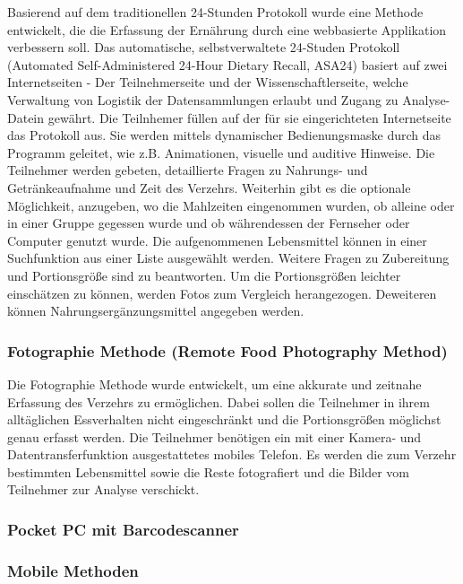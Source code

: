 Basierend auf dem traditionellen 24-Stunden Protokoll wurde eine Methode entwickelt, die die Erfassung der Ernährung durch eine webbasierte Applikation verbessern soll. Das automatische, selbstverwaltete 24-Studen Protokoll (Automated Self-Administered 24-Hour Dietary Recall, ASA24) basiert auf zwei Internetseiten - Der Teilnehmerseite und der Wissenschaftlerseite, welche Verwaltung von Logistik der Datensammlungen erlaubt und  Zugang zu Analyse-Datein gewährt. Die Teilnhemer füllen auf der für sie eingerichteten Internetseite das Protokoll aus. Sie werden mittels dynamischer Bedienungsmaske durch das Programm geleitet, wie z.B. Animationen, visuelle und auditive Hinweise. Die Teilnehmer werden gebeten, detaillierte Fragen zu Nahrungs- und Getränkeaufnahme und Zeit des Verzehrs. Weiterhin gibt es die optionale Möglichkeit, anzugeben, wo die Mahlzeiten eingenommen wurden, ob alleine oder in einer Gruppe gegessen wurde und ob währendessen der Fernseher oder Computer genutzt wurde. 
Die aufgenommenen Lebensmittel können in einer Suchfunktion aus einer Liste ausgewählt werden. Weitere Fragen zu Zubereitung und Portionsgröße sind zu beantworten. Um die Portionsgrößen leichter einschätzen zu können, werden Fotos zum Vergleich herangezogen. Deweiteren können Nahrungsergänzungsmittel angegeben werden.  \cite{asa24} \cite{Subar20121134}





\subsubsection{Fotographie Methode (Remote Food Photography Method)}

Die Fotographie Methode wurde entwickelt, um eine akkurate und zeitnahe Erfassung des Verzehrs zu ermöglichen. Dabei sollen die Teilnehmer in ihrem alltäglichen Essverhalten nicht eingeschränkt und die Portionsgrößen möglichst genau erfasst werden. \cite{5333123}
Die Teilnehmer benötigen ein mit einer Kamera- und Datentransferfunktion ausgestattetes mobiles Telefon. Es werden die zum Verzehr bestimmten Lebensmittel sowie die Reste fotografiert und die Bilder vom Teilnehmer zur Analyse verschickt. \cite{BJN:3324360}




\subsubsection{Pocket PC mit Barcodescanner}

\subsubsection{Mobile Methoden}

